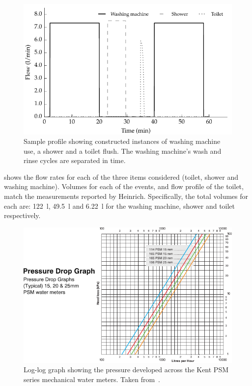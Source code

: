     \begin{figure}
      \centering
      \includegraphics[width=\linewidth]{content/pt1/02-WirelessWaterMeter/graphics/graph_profile}
      \caption{
          Sample profile showing constructed instances of washing machine use, a shower and a toilet flush.
          The washing machine's wash and rinse cycles are separated in time.}
      \label{fig:profileSample}
    \end{figure}

     shows the flow rates for each of the three items considered (toilet, shower and washing machine).
    Volumes for each of the events, and flow profile of the toilet, match the measurements reported by Heinrich.
    Specifically, the total volumes for each are: \SI{122}{\litre}, \SI{49.5}{\litre} and \SI{6.22}{\litre} for the washing machine, shower and toilet respectively.

    \begin{figure}
        \centering
        \includegraphics[width=\linewidth]{content/pt1/02-WirelessWaterMeter/graphics/Kent-PSM-HeadLoss}
        \caption{
            \label{fig:headloss}
            Log-log graph showing the pressure developed across the Kent PSM series mechanical water meters. Taken from~\cite{Elster2008}.
        }
    \end{figure}

